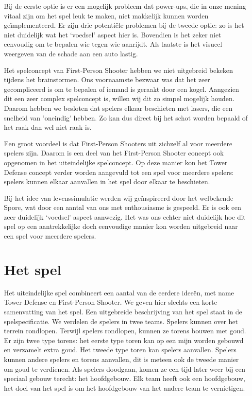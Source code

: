 Bij de eerste optie is er een mogelijk probleem dat power-ups, die in onze mening vitaal zijn om het spel leuk te maken, niet makkelijk kunnen worden ge\"implementeerd. Er zijn drie potenti\"ele problemen bij de tweede optie: zo is het niet duidelijk wat het `voedsel' aspect hier is. Bovendien is het zeker niet eenvoudig om te bepalen wie tegen wie aanrijdt. Als laatste is het visueel weergeven van de schade aan een auto lastig.

Het spelconcept van First-Person Shooter hebben we niet uitgebreid bekeken tijdens het brainstormen. Ons voornaamste bezwaar was dat het zeer gecompliceerd is om te bepalen of iemand is geraakt door een kogel. Aangezien dit een zeer complex spelconcept is, willen wij dit zo simpel mogelijk houden. Daarom hebben we besloten dat spelers elkaar beschieten met lasers, die een snelheid van 'oneindig' hebben. Zo kan dus direct bij het schot worden bepaald of het raak dan wel niet raak is.

Een groot voordeel is dat First-Person Shooters uit zichzelf al voor meerdere spelers zijn. Daarom is een deel van het First-Person Shooter concept ook opgenomen in het uiteindelijke spelconcept. Op deze manier kon het Tower Defense concept verder worden aangevuld tot een spel voor meerdere spelers: spelers kunnen elkaar aanvallen in het spel door elkaar te beschieten.

Bij het idee van levenssimulatie werden wij ge\"inspireerd door het welbekende Spore, wat door een aantal van ons met enthousiasme is gespeeld. Er is ook een zeer duidelijk `voedsel' aspect aanwezig. Het was ons echter niet duidelijk hoe dit spel op een aantrekkelijke doch eenvoudige manier kon worden uitgebreid naar een spel voor meerdere spelers.

\section{Het spel}
Het uiteindelijke spel combineert een aantal van de eerdere idee\"en, met name Tower Defense en First-Person Shooter. We geven hier slechts een korte samenvatting van het spel. Een uitgebreide beschrijving van het spel staat in de spelspecificatie. We verdelen de spelers in twee teams. Spelers kunnen over het terrein rondlopen. Terwijl spelers rondlopen, kunnen ze torens bouwen met goud. Er zijn twee type torens: het eerste type toren kan op een mijn worden gebouwd en verzamelt extra goud. Het tweede type toren kan spelers aanvallen. Spelers kunnen andere spelers en torens aanvallen, dit is meteen ook de tweede manier om goud te verdienen. Als spelers doodgaan, komen ze een tijd later weer bij een speciaal gebouw terecht: het hoofdgebouw. Elk team heeft ook een hoofdgebouw, het doel van het spel is om het hoofdgebouw van het andere team te vernietigen.

